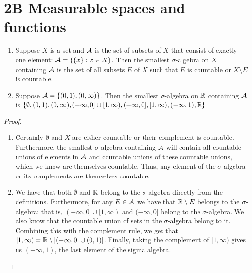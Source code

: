 \section{2B Measurable spaces and functions}


\begin{exercise}{2}
\begin{enumerate}
    \item Suppose $X$ is a set and $\mathcal{A}$ is the set of subsets of $X$ that consist of exactly one element: $\mathcal{A} = \{ \{x\} : x \in X\}$. 
    Then the smallest $\sigma$-algebra on $X$ containing $\mathcal{A}$ is the set of all subsets $E$ of $X$ such that $E$ is countable or $X \setminus E$ is countable.
    \item Suppose $\mathcal{A} = \{ (0,1), (0,\infty)\}$.
    Then the smallest $\sigma$-algebra on $\mathbb{R}$ containing $\mathcal{A}$ is $\{ \emptyset, (0,1), (0,\infty), (-\infty, 0] \cup [1,\infty), (-\infty, 0], [1,\infty), (-\infty, 1), \mathbb{R}\}$
\end{enumerate}
\end{exercise}
\begin{proof}
\begin{enumerate}
    \item Certainly $\emptyset$ and $X$ are either countable or their complement is countable.
    Furthermore, the smallest $\sigma$-algebra containing $\mathcal{A}$ will contain all countable unions of elements in $\mathcal{A}$ and countable unions of these countable unions, which we know are themselves countable. 
    Thus, any element of the $\sigma$-algebra or its complements are themselves countable.
    \item We have that both $\emptyset$ and $\mathbb{R}$ belong to the $\sigma$-algebra directly from the definitions.
    Furthermore, for any $E \in \mathcal{A}$ we have that $\mathbb{R} \setminus E$ belongs to the $\sigma$-algebra;
    that is, $(-\infty,0] \cup [1,\infty)$ and $(-\infty, 0]$ belong to the $\sigma$-algebra.
    We also know that the countable union of sets in the $\sigma$-algebra belong to it.
    Combining this with the complement rule, we get that $[1,\infty) = \mathbb{R} \setminus [(-\infty, 0] \cup (0,1) ]$.
    Finally, taking the complement of $[1, \infty)$ gives us $(-\infty, 1)$, the last element of the sigma algebra.
\end{enumerate}
\end{proof} 

